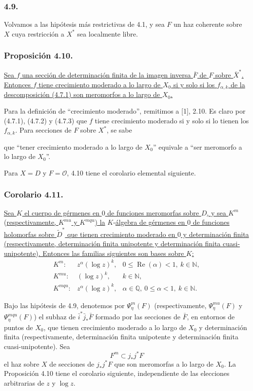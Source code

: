 \subsubsection*{4.9.}
Volvamos a las hipótesis más restrictivas de 4.1, y sea $F$ un haz
coherente sobre $X$ cuya restricción a $X^*$ sea localmente libre.

\subsubsection*{Proposición 4.10.}
\underline{Sea $f$ una sección de determinación finita de la imagen
inversa $\bar F$ de $F$ sobre $\bar X^*$. Entonces $f$ tiene crecimiento
moderado a lo largo de $X_0$ si y solo si los $f_{\alpha,k}$ de la
descomposición (4.7.1) son meromorfos a lo largo de $X_0$.}

Para la definición de ``crecimiento moderado'', remitimos a [1], 2.10.
Es claro por (4.7.1), (4.7.2) y (4.7.3) que $f$ tiene crecimiento
moderado si y solo si lo tienen los $f_{\alpha,k}$. Para secciones de
$F$ sobre $X^*$, se sabe

\pageoriginale

que ``tener crecimiento moderado a lo largo de $X_0$'' equivale a
``ser meromorfo a lo largo de $X_0$''.

Para $X=D$ y $F=\mathcal O$, 4.10 tiene el corolario elemental siguiente.

\subsubsection*{Corolario 4.11.}
\underline{Sea $K$ el cuerpo de gérmenes en $0$ de funciones meromorfas
sobre $D$, y sea $K^m$} (\underline{respectivamente, $K^{mu}$ y $K^{mqu}$) la}
$K$-\underline{álgebra de gérmenes en $0$ de funciones holomorfas sobre
$\widetilde D^*$ que tienen crecimiento moderado en $0$ y determinación
finita (respectivamente, determinación finita unipotente y determinación
finita cuasi-unipotente})\underline{. Entonces las familias siguientes son bases
sobre $K$:}
\[
\begin{array}{lll}
K^m:&z^\alpha(\log z)^k,
  &0\leq\operatorname{Re}(\alpha)<1,\ k\in\mathbb N,\\[2pt]
K^{mu}:&(\log z)^k,&k\in\mathbb N,\\[2pt]
K^{mqu}:&z^\alpha(\log z)^k,
  &\alpha\in\mathbb Q,\ 0\leq\alpha<1,\ k\in\mathbb N.
\end{array}
\]

Bajo las hipótesis de 4.9, denotemos por $\Psi_\eta^m(F)$
(respectivamente, $\Psi_\eta^{mu}(F)$ y $\Psi_\eta^{mqu}(F)$) el
subhaz de $\bar i^*\bar j_*\bar F$ formado por las secciones de
$\bar F$, en entornos de puntos de $X_0$, que tienen crecimiento
moderado a lo largo de $X_0$ y determinación finita (respectivamente,
determinación finita unipotente y determinación finita
cuasi-unipotente). Sea
\[
F^m\subset j_*j^*F
\]
el haz sobre $X$ de secciones de $j_*j^*F$ que son meromorfas a lo
largo de $X_0$. La Proposición 4.10 tiene el corolario siguiente,
independiente de las elecciones arbitrarias de $z$ y $\log z$.

